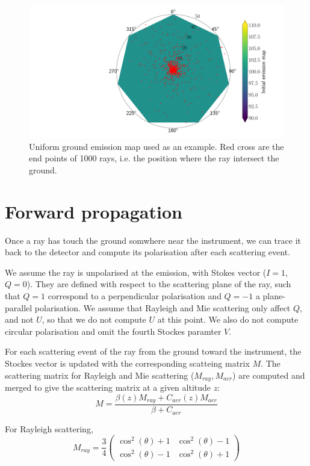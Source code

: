 \documentclass{article}
\begin{document}
\begin{figure}
  \includegraphics[width=\textwidth]{MS_uniform_grd_endpoints.png}
  \caption{Uniform ground emission map used as an example. Red cross are the end points of 1000 rays, i.e. the position where the ray intersect the ground.}
\end{figure}



\section{Forward propagation}

Once a ray has touch the ground somwhere near the instrument, we can trace it back to the detector and compute its polarisation after each scattering event.

We assume the ray is unpolarised at the emission, with Stokes vector ($I = 1$, $Q = 0$). They are defined with respect to the scattering plane of the ray, such that $Q=1$ correspond to a perpendicular polarisation and $Q=-1$ a plane-parallel  polarisation.
We assume that Rayleigh and Mie scattering only affect $Q$, and not $U$, so that we do not compute $U$ at this point. We also do not compute circular polarisation and omit the fourth Stockes paramter $V$.

For each scattering event of the ray from the ground toward the instrument, the Stockes vector is updated with the corresponding scatteing matrix $M$.
The scattering matrix for Rayleigh and Mie scattering ($M_{ray}, M_{aer}$) are computed and merged to give the scattering matrix at a given altitude $z$:
\begin{equation}
  M = \frac{\beta(z) M_{ray} + C_{aer}(z) M_{aer}}{\beta + C_{aer}}
\end{equation}

For Rayleigh scattering,
\begin{equation}
M_{ray} = \frac{3}{4}
\begin{pmatrix}
\cos^2(\theta) + 1 & \cos^2(\theta) - 1\\
\cos^2(\theta) - 1 & \cos^2(\theta) + 1

\end{pmatrix}
\end{equation}
\end{document}

